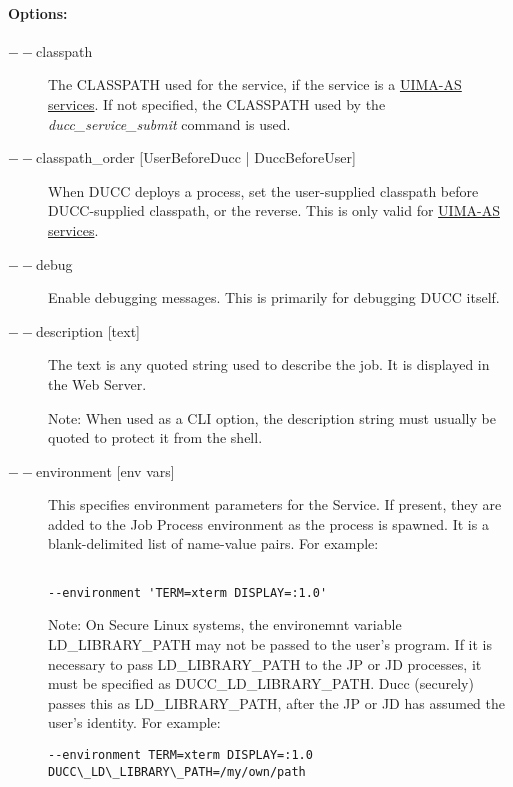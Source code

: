     \paragraph{Options:}
    \begin{description}

        \item[$--$classpath] The CLASSPATH used for the service, if the service is a
          \hyperref[sec:services.types]{UIMA-AS services}.  If not specified, the CLASSPATH used
          by the {\em ducc\_service\_submit} command is used.
          
        \item[$--$classpath\_order {[UserBeforeDucc | DuccBeforeUser]} ] When DUCC deploys a process,
          set the user-supplied classpath before DUCC-supplied classpath, or the reverse.  This is
          only valid for  \hyperref[sec:services.types]{UIMA-AS services}.
          
        \item[$--$debug ]
          Enable debugging messages. This is primarily for debugging DUCC itself. 
          
        \item[$--$description {[text]}] The text is any quoted string used to describe the job. It is
          displayed in the Web Server.

          Note: When used as a CLI option, the description string must usually be quoted to protect
          it from the shell.
    
        \item[$--$environment {[env vars]}]  
          This specifies environment parameters for the Service. If present, they are added 
          to the Job Process environment as the process is spawned. It is a blank-delimited 
          list of name-value pairs. For example: 
\begin{verbatim}

--environment 'TERM=xterm DISPLAY=:1.0'
\end{verbatim}
          
          Note: On Secure Linux systems, the environemnt variable 
          LD\_LIBRARY\_PATH may not be passed to the user's program. If it is 
          necessary to pass LD\_LIBRARY\_PATH to the JP or JD processes, it must be 
          specified as DUCC\_LD\_LIBRARY\_PATH. Ducc (securely) passes this as 
          LD\_LIBRARY\_PATH, after the JP or JD has assumed the user's identity. For 
          example: 
\begin{verbatim}
--environment TERM=xterm DISPLAY=:1.0 DUCC\_LD\_LIBRARY\_PATH=/my/own/path
\end{verbatim}
          

\end{description}
